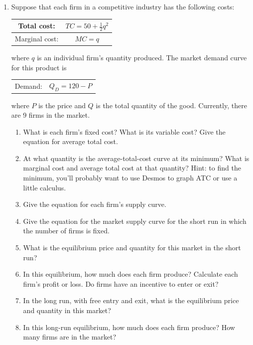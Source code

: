 \documentclass{article}
\begin{document}
\begin{enumerate}
\begin{enumerate}
	\item Graph the long-run supply curve for this market with specific numbers on the axes as relevant.
	
	\end{enumerate}
	
\item Suppose that each firm in a competitive industry has the following costs:

	\begin{center}
	\begin{tabular}{ c | c }
	Total cost: & $TC = 50 + \frac{1}{2}q^2$ \\
	\hline
	Marginal cost: & $MC = q$
	\end{tabular}
	\end{center}
	
	where $q$ is an individual firm's quantity produced. The market demand curve for this product is
	
	\begin{center}
	\begin{tabular}{ c c }
	Demand: & $Q_D = 120 - P$
	\end{tabular}
	\end{center}
	
	where $P$ is the price and $Q$ is the total quantity of the good. Currently, there are 9 firms in the market.
	
	\begin{enumerate}
	
	\item What is each firm's fixed cost? What is its variable cost? Give the equation for average total cost.
	
	\item At what quantity is the average-total-cost curve at its minimum? What is marginal cost and average total cost at that quantity? Hint: to find the minimum, you'll probably want to use Desmos to graph ATC or use a little calculus.
	
	\item Give the equation for each firm's supply curve.
	
	\item Give the equation for the market supply curve for the short run in which the number of firms is fixed.
	
	\item What is the equilibrium price and quantity for this market in the short run?
	
	\item In this equilibrium, how much does each firm produce? Calculate each firm's profit or loss. Do firms have an incentive to enter or exit?
	
	\item In the long run, with free entry and exit, what is the equilibrium price and quantity in this market?
	
	\item In this long-run equilibrium, how much does each firm produce? How many firms are in the market?
	
	\end{enumerate}

\end{enumerate}
\end{document}

